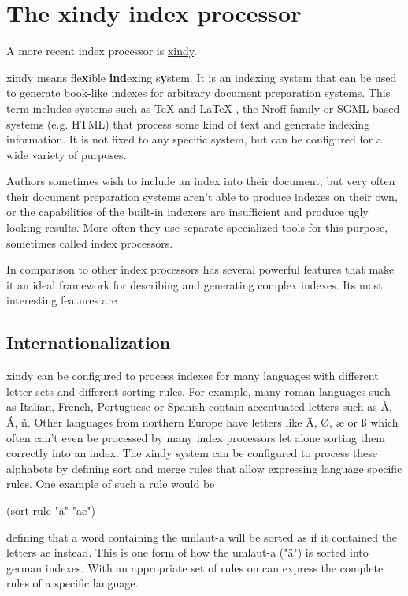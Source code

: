 \section{The xindy index processor}

A more recent index processor is \href{http://www.xindy.org}{xindy}. 

xindy means fle\textbf{x}ible \textbf{ind}exing s\textbf{y}stem. It is an indexing system that can be used to generate book-like indexes for arbitrary document preparation systems. This term includes systems such as TeX and LaTeX , the Nroff-family or SGML-based systems (e.g. HTML) that process some kind of text and generate indexing information. It is not fixed to any specific system, but can be configured for a wide variety of purposes.

Authors sometimes wish to include an index into their document, but very often their document preparation systems aren't able to produce indexes on their own, or the capabilities of the built-in indexers are insufficient and produce ugly looking results. More often they use separate specialized tools for this purpose, sometimes called index processors.

In comparison to other index processors  has several powerful features that make it an ideal framework for describing and generating complex indexes. Its most interesting features are

\subsection{Internationalization}

xindy can be configured to process indexes for many languages with different letter sets and different sorting rules. For example, many roman languages such as Italian, French, Portuguese or Spanish contain accentuated letters such as À, Á, ñ. Other languages from northern Europe have letters like Ä, Ø, æ or ß which often can't even be processed by many index processors let alone sorting them correctly into an index. The xindy system can be configured to process these alphabets by defining sort and merge rules that allow expressing language specific rules. One example of such a rule would be

(sort-rule "ä" "ae")

defining that a word containing the umlaut-a will be sorted as if it contained the letters ae instead. This is one form of how the umlaut-a ("ä") is sorted into german indexes. With an appropriate set of rules on can express the complete rules of a specific language.
\endinput




















